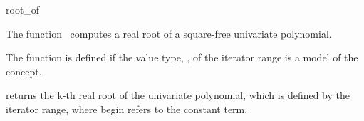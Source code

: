 \begin{ccRefFunction}{root_of}

\ccDefinition

The function \ccRefName\ computes a real root of a square-free univariate 
polynomial.

The function is defined if the value type, ,
of the iterator range is a model of the  concept. 


        {
        returns the k-th real root of the univariate polynomial, 
        which is defined by the iterator range, 
        where begin refers to the constant term. 
        }


\ccSeeAlso

\\
\\


\end{ccRefFunction}
